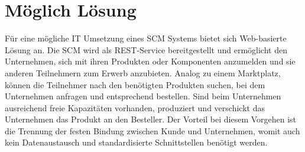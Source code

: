 \section{Möglich Lösung}
Für eine mögliche IT Umsetzung eines \ac{SCM} Systems bietet sich Web-basierte Lösung an. Die \ac{SCM} wird als REST-Service bereitgestellt und ermöglicht den Unternehmen, sich mit ihren Produkten oder Komponenten anzumelden und sie anderen Teilnehmern zum Erwerb anzubieten. Analog zu einem Marktplatz, können die Teilnehmer nach den benötigten Produkten suchen, bei dem Unternehmen anfragen und entsprechend bestellen. Sind beim Unternehmen ausreichend freie Kapazitäten vorhanden, produziert und verschickt das Unternehmen das Produkt an den Besteller. 
Der Vorteil bei diesem Vorgehen ist die Trennung der festen Bindung zwischen Kunde und Unternehmen, womit auch kein Datenaustausch und standardisierte Schnittstellen benötigt werden.

